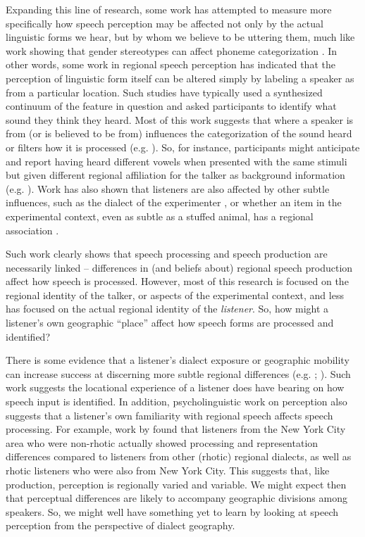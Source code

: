 \documentclass[output=paper]{LSP/langsci}
\begin{document}
Expanding this line of research, some work has attempted to measure more specifically how speech perception may be affected not only by the actual linguistic forms we hear, but by whom we believe to be uttering them, much like work showing that gender stereotypes can affect phoneme categorization \citep{strand_uncovering_1999}. In other words, some work in regional speech perception has indicated that the perception of linguistic form itself can be altered simply by labeling a speaker as from a particular location. Such studies have typically used a synthesized continuum of the feature in question and asked participants to identify what sound they think they heard. Most of this work suggests that where a speaker is from (or is believed to be from) influences the categorization of the sound heard or filters how it is processed (e.g. \citealt{allbritten_sounding_2011, labov_understanding_1997,plichta_/ay/s_2005}). So, for instance, participants might anticipate and report having heard different vowels when presented with the same stimuli but given different regional affiliation for the talker as background information (e.g. \citealt{niedzielski_effect_1999}). Work has also shown that listeners are also affected by other subtle influences, such as the dialect of the experimenter \citep{hay_factors_2006}, or whether an item in the experimental context, even as subtle as a stuffed animal, has a regional association \citep{hay_stuffed_2010}.

Such work clearly shows that speech processing and speech production are necessarily linked – differences in (and beliefs about) regional speech production affect how speech is processed. However, most of this research is focused on the regional identity of the talker, or aspects of the experimental context, and less has focused on the actual regional identity of the \textit{listener}. So, how might a listener’s own geographic “place” affect how speech forms are processed and identified?  

\largerpage[-1]
There is some evidence that a listener’s dialect exposure or geographic mobility can increase success at discerning more subtle regional differences (e.g. \citealt{clopper_free_2007}; \citealt{evans_vowel_2004}). Such work suggests the locational experience of a listener does have bearing on how speech input is identified. In addition, psycholinguistic work on perception also suggests that a listener’s own familiarity with regional speech affects speech processing. For example, work by \citet{sumner_effect_2009} found that listeners from the New York City area who were non-rhotic actually showed processing and representation differences compared to listeners from other (rhotic) regional dialects, as well as rhotic listeners who were also from New York City. This suggests that, like production, perception is regionally varied and variable. We might expect then that perceptual differences are likely to accompany geographic divisions among speakers. So, we might well have something yet to learn by looking at speech perception from the perspective of dialect geography. 
\end{document}
